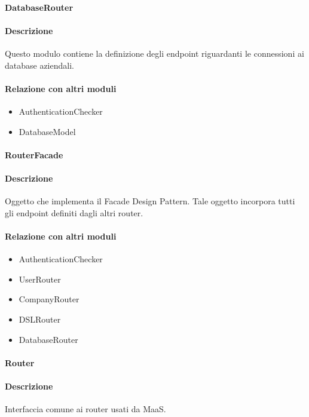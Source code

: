 \paragraph{DatabaseRouter}
\paragraph*{Descrizione}
Questo modulo contiene la definizione degli endpoint riguardanti le connessioni ai database aziendali.

\paragraph*{Relazione con altri moduli}
\begin{itemize}
\item AuthenticationChecker
\item DatabaseModel
\end{itemize}

\paragraph{RouterFacade}
\paragraph*{Descrizione}
Oggetto che implementa il Facade Design Pattern. Tale oggetto incorpora tutti gli endpoint definiti dagli altri router.

\paragraph*{Relazione con altri moduli}
\begin{itemize}
\item AuthenticationChecker
\item UserRouter
\item CompanyRouter
\item DSLRouter
\item DatabaseRouter
\end{itemize}

\paragraph{Router}
\paragraph*{Descrizione}
Interfaccia comune ai router usati da MaaS.

